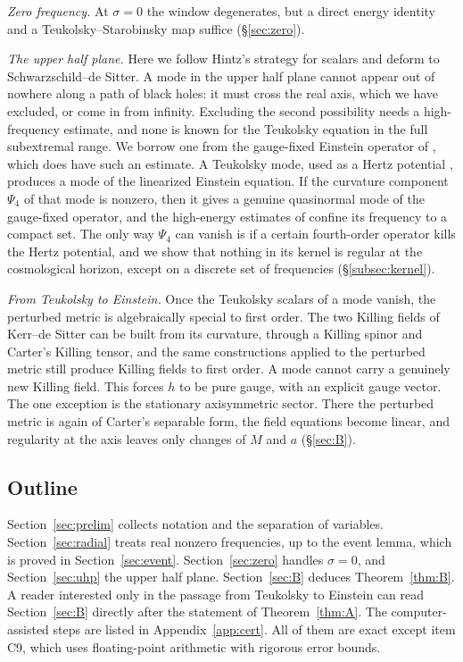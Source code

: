 \documentclass[11pt]{amsart}
\theoremstyle{definition}
\theoremstyle{remark}
\numberwithin{equation}{section}
\begin{document}
\emph{Zero frequency.} At $\sigma=0$ the window degenerates, but a direct energy identity and a
Teukolsky--Starobinsky map suffice (\S\ref{sec:zero}).

\emph{The upper half plane.} Here we follow Hintz's strategy for scalars and deform to Schwarzschild--de Sitter. A
mode in the upper half plane cannot appear out of nowhere along a path of black holes: it must cross the real axis,
which we have excluded, or come in from infinity. Excluding the second possibility needs a high-frequency estimate,
and none is known for the Teukolsky equation in the full subextremal range. We borrow one from the gauge-fixed
Einstein operator of \cite{HPV25}, which does have such an estimate. A Teukolsky mode, used as a Hertz potential
\cite{Wal78}, produces a mode of the linearized Einstein equation. If the curvature component $\Psi_4$ of that mode is
nonzero, then it gives a genuine quasinormal mode of the gauge-fixed operator, and the high-energy estimates of
\cite{HPV25} confine its frequency to a compact set. The only way $\Psi_4$ can vanish is if a certain fourth-order
operator kills the Hertz potential, and we show that nothing in its kernel is regular at the cosmological horizon,
except on a discrete set of frequencies (\S\ref{subsec:kernel}).

\emph{From Teukolsky to Einstein.} Once the Teukolsky scalars of a mode vanish, the perturbed metric is algebraically
special to first order. The two Killing fields of Kerr--de Sitter can be built from its curvature, through a Killing
spinor and Carter's Killing tensor, and the same constructions applied to the perturbed metric still produce Killing
fields to first order. A mode cannot carry a genuinely new Killing field. This forces $h$ to be pure gauge, with an
explicit gauge vector. The one exception is the stationary axisymmetric sector. There the perturbed metric is again of
Carter's separable form, the field equations become linear, and regularity at the axis leaves only changes of $M$ and
$a$ (\S\ref{sec:B}).

\subsection{Outline}
Section~\ref{sec:prelim} collects notation and the separation of variables. Section~\ref{sec:radial} treats real
nonzero frequencies, up to the event lemma, which is proved in Section~\ref{sec:event}. Section~\ref{sec:zero} handles
$\sigma=0$, and Section~\ref{sec:uhp} the upper half plane. Section~\ref{sec:B} deduces Theorem~\ref{thm:B}. A reader
interested only in the passage from Teukolsky to Einstein can read Section~\ref{sec:B} directly after the statement of
Theorem~\ref{thm:A}. The computer-assisted steps are listed in Appendix~\ref{app:cert}. All of them are exact except
item C9, which uses floating-point arithmetic with rigorous error bounds.
\end{document}
